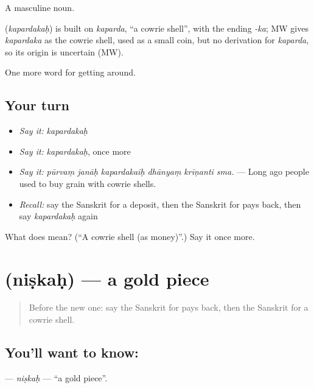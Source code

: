 A masculine noun.

\begin{cousinweb}
\textbf{} (\emph{kapardakaḥ}) is built on \emph{kaparda}, \textquotedblleft{}a cowrie shell\textquotedblright{}, with the ending \emph{-ka}; MW gives \emph{kapardaka} as the cowrie shell, used as a small coin, but no derivation for \emph{kaparda}, so its origin is uncertain (MW).
\end{cousinweb}

\begin{grammarlens}[title={What you've built}]
One more word for getting around.
\end{grammarlens}

\subsection*{Your turn}
\begin{itemize}
\raggedright
  \item \emph{Say it:} \emph{kapardakaḥ}
  \item \emph{Say it:} \emph{kapardakaḥ}, once more
  \item \emph{Say it:} \emph{pūrvaṃ janāḥ kapardakaiḥ dhānyaṃ krīṇanti sma.} — Long ago people used to buy grain with cowrie shells.
  \item \emph{Recall:} say the Sanskrit for a deposit, then the Sanskrit for pays back, then say \emph{kapardakaḥ} again
\end{itemize}

\begin{tcolorbox}[breakable,colback=teal!4,colframe=teal!35!black,title={Before you move on}]
What does  mean? (\textquotedblleft{}A cowrie shell (as money)\textquotedblright{}.) Say it once more.
\end{tcolorbox}
\section[\texorpdfstring{\sk{निष्कः} (niṣkaḥ)}{निष्कः (niṣkaḥ)}]{ (niṣkaḥ) — a gold piece}

\label{lesson:SA-C435-niskah}



\begin{quote}
Before the new one: say the Sanskrit for pays back, then the Sanskrit for a cowrie shell.
\end{quote}

\subsection*{You'll want to know: }
\textbf{} — \emph{niṣkaḥ} — \textquotedblleft{}a gold piece\textquotedblright{}.

